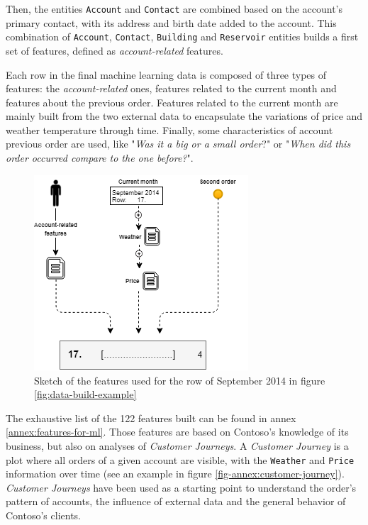 Then, the entities \texttt{Account} and \texttt{Contact} are combined based on the account's primary contact, with its address and birth date added to the account. This combination of \texttt{Account}, \texttt{Contact}, \texttt{Building} and \texttt{Reservoir} entities builds a first set of features, defined as \textit{account-related} features.

Each row in the final machine learning data is composed of three types of features: the \textit{account-related} ones, features related to the current month and features about the previous order. Features related to the current month are mainly built from the two external data to encapsulate the variations of price and weather temperature through time. Finally, some characteristics of account previous order are used, like "\textit{Was it a big or a small order}?" or "\textit{When did this order occurred compare to the one before?}".


\begin{figure}[h]
    \centering
    \includegraphics[width=8cm]{images/data-build-ml-example-row.png}
\caption[Feature's combination for specific month]{Sketch of the features used for the row of September 2014 in figure \ref{fig:data-build-example}}
    \label{fig:data-build-row-example}
\end{figure}

The exhaustive list of the 122 features built can be found in annex \ref{annex:features-for-ml}. Those features are based on Contoso's knowledge of its business, but also on analyses of \textit{Customer Journeys}. A \textit{Customer Journey} is a plot where all orders of a given account are visible, with the \texttt{Weather} and \texttt{Price} information over time (see an example in figure \ref{fig-annex:customer-journey}). \textit{Customer Journeys} have been used as a starting point to understand the order's pattern of accounts, the influence of external data and the general behavior of Contoso's clients.


